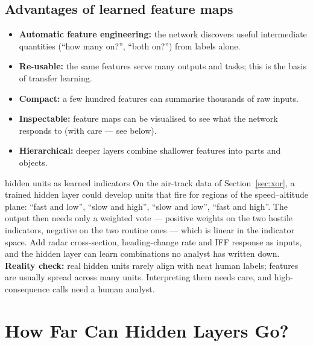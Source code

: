 \documentclass[11pt]{article}
\begin{document}
\subsection{Advantages of learned feature maps}
\begin{itemize}
\item \textbf{Automatic feature engineering:} the network discovers useful intermediate quantities (``how many on?'', ``both on?'') from labels alone.
\item \textbf{Re-usable:} the same features serve many outputs and tasks; this is the basis of transfer learning.
\item \textbf{Compact:} a few hundred features can summarise thousands of raw inputs.
\item \textbf{Inspectable:} feature maps can be visualised to see what the network responds to (with care --- see below).
\item \textbf{Hierarchical:} deeper layers combine shallower features into parts and objects.
\end{itemize}

\begin{defence}{hidden units as learned indicators}
On the air-track data of Section~\ref{sec:xor}, a trained hidden layer could develop units that fire for regions of the speed--altitude plane: ``fast and low'', ``slow and high'', ``slow and low'', ``fast and high''. The output then needs only a weighted vote --- positive weights on the two hostile indicators, negative on the two routine ones --- which is linear in the indicator space. Add radar cross-section, heading-change rate and IFF response as inputs, and the hidden layer can learn combinations no analyst has written down. \textbf{Reality check:} real hidden units rarely align with neat human labels; features are usually spread across many units. Interpreting them needs care, and high-consequence calls need a human analyst.
\end{defence}

\section{How Far Can Hidden Layers Go?}
\end{document}
